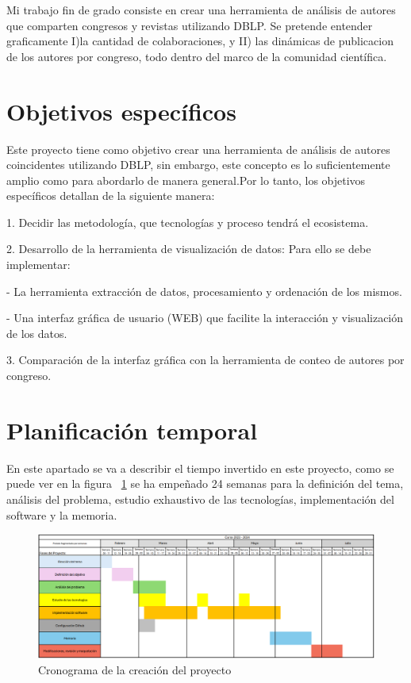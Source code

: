 \documentclass[a4paper, 12pt]{book}
\begin{document}
Mi trabajo fin de grado consiste en crear una herramienta de análisis de autores que comparten congresos y revistas utilizando DBLP.
Se pretende entender graficamente I)la cantidad de colaboraciones, y II) las dinámicas de publicacion de los autores por congreso, todo dentro
del marco de la comunidad científica.



\section{Objetivos específicos}
\label{sec:objetivos-especificos}

Este proyecto tiene como objetivo crear una herramienta de análisis de autores coincidentes utilizando DBLP, sin embargo, 
este concepto es lo suficientemente amplio como para abordarlo de manera general.Por lo tanto, los objetivos específicos detallan
de la siguiente manera:

1. Decidir las metodología, que tecnologías y proceso tendrá el ecosistema.

2. Desarrollo de la herramienta de visualización de datos:
Para ello se debe implementar:

- La herramienta extracción de datos, procesamiento y ordenación de los mismos.

- Una interfaz gráfica de usuario (WEB) que facilite la interacción y visualización de los datos.

3. Comparación de la interfaz gráfica con la herramienta de conteo de autores por congreso.







\section{Planificación temporal}
\label{sec:planificacion-temporal}

En este apartado se va a describir el tiempo invertido en este proyecto, como se puede ver en la figura ~\ref{fig:cronograma} se ha empeñado 24 semanas para la definición del tema, análisis del problema, estudio exhaustivo de las tecnologías, implementación del software y la memoria.

\begin{figure}[h]
  \centering
  \includegraphics[width=16cm, keepaspectratio]{img/cronograma.png}
  \caption{Cronograma de la creación del proyecto}
  \label{fig:cronograma}
\end{figure}
\end{document}
